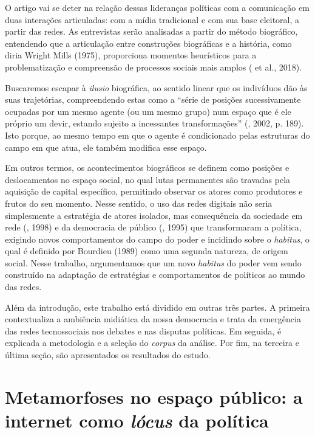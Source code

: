 O artigo vai se deter na relação dessas lideranças políticas com a
comunicação em duas interações articuladas: com a mídia tradicional e
com sua base eleitoral, a partir das redes. As entrevistas serão
analisadas a partir do método biográfico, entendendo que a articulação
entre construções biográficas e a história, como diria Wright Mills
(1975), proporciona momentos heurísticos para a problematização e
compreensão de processos sociais mais amplos ( et al., 2018).

Buscaremos escapar à \emph{ilusio} biográfica, ao sentido linear que os
indivíduos dão às suas trajetórias, compreendendo estas como a ``série
de posições sucessivamente ocupadas por um mesmo agente (ou um mesmo
grupo) num espaço que é ele próprio um devir, estando sujeito a
incessantes transformações'' (, 2002, p. 189). Isto porque, ao
mesmo tempo em que o agente é condicionado pelas estruturas do campo em
que atua, ele também modifica esse espaço.

Em outros termos, os acontecimentos biográficos se definem como posições
e deslocamentos no espaço social, no qual lutas permanentes são travadas
pela aquisição de capital específico, permitindo observar os atores como
produtores e frutos do seu momento. Nesse sentido, o uso das redes
digitais não seria simplesmente a estratégia de atores isolados, mas
consequência da sociedade em rede (, 1998) e da democracia de
público (, 1995) que transformaram a política, exigindo novos
comportamentos do campo do poder e incidindo sobre o \emph{habitus}, o
qual é definido por Bourdieu (1989) como uma segunda natureza, de origem
social. Nesse trabalho, argumentamos que um novo \emph{habitus} do poder
vem sendo construído na adaptação de estratégias e comportamentos de
políticos ao mundo das redes.

Além da introdução, este trabalho está dividido em outras três partes. A
primeira contextualiza a ambiência midiática da nossa democracia e trata
da emergência das redes tecnossociais nos debates e nas disputas
políticas. Em seguida, é explicada a metodologia e a seleção do
\emph{corpus} da análise. Por fim, na terceira e última seção, são
apresentados os resultados do estudo.

\section{Metamorfoses no espaço público: a internet como \emph{lócus} da política}

